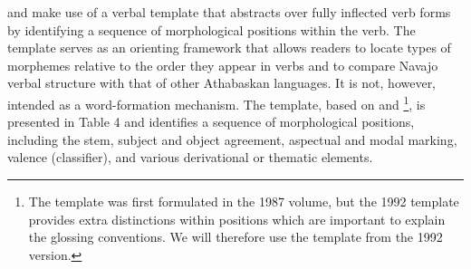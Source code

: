 \citet{Young:1987uj} and \citet{Young:1992bd} make use of a verbal template that abstracts over fully inflected verb forms by identifying a sequence of morphological positions within the verb. The template serves as an orienting framework that allows readers to locate types of morphemes relative to the order they appear in verbs and to compare Navajo verbal structure with that of other Athabaskan languages. It is not, however, intended as a word-formation mechanism. The template, based on \citet{Young:1987uj} and \citet{Young:1992bd}\footnote{The template was first formulated in the 1987 volume, but the 1992 template provides extra distinctions within positions which are important to explain the glossing conventions. We will therefore use the template from the 1992 version.}, is presented in Table 4 and identifies a sequence of morphological positions, including the stem, subject and object agreement, aspectual and modal marking, valence (classifier), and various derivational or thematic elements.

